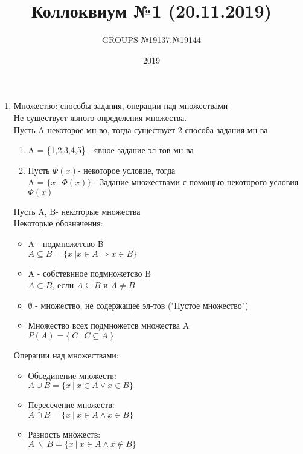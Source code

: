 \documentclass{article}
\title{ Коллоквиум №1 (20.11.2019) }
\author{GROUPS №19137,№19144}
\date{2019\\}
\begin{document}
  \maketitle
  \begin{enumerate}
    \item Множество: способы задания, операции над множествами
    \\ Не существует явного определения множества.
    \\ Пусть A некоторое мн-во, тогда существует 2 способа задания мн-ва
          \begin{enumerate}
          \item A = \{1,2,3,4,5\} - явное задание эл-тов мн-ва \\
          \item Пусть $\Phi(x)$- некоторое условие, тогда \\A = $\{x \ | \ \Phi(x) \}$ - Задание множествами с помощью некоторого условия $\Phi(x)$
          \end{enumerate}
      Пусть A, B- некоторые множества \\
      Некоторые обозначения:
      \begin{itemize}
          \item A - подмножетсво B \\
          $A \subseteq B = \{x \ | x\in{A} \Rightarrow x\in{B} \}$
          \item A - собстевнное подмножетсво B \\
          $A \subset B$, если $A \subseteq B$ и $A\ne{B} $
          \item $\emptyset$ - множество, не содержащее эл-тов ("Пустое множество")
          \item Множество всех подмножетсв множества A
          \\ $P(A) = \{ \ C\ |\ C \subseteq{A} \ \} $
      \end{itemize}
      Операции над множествами:
      \begin{itemize}
        \item Объединение множеств:
        \\ $A\cup{B} = \{ x \ | \ x \in{A} \lor x\in{B}\}$
        \item Пересечение множеств:
        \\ $A\cap{B} = \{ x \ | \ x \in{A} \land x\in{B}\}$
        \item Разность множеств:
        \\ $A \ \backslash\  B = \{x\ | \ x\in{A} \land x\notin{B} \}$
      \end{itemize}
  \end{enumerate}
\end{document}
